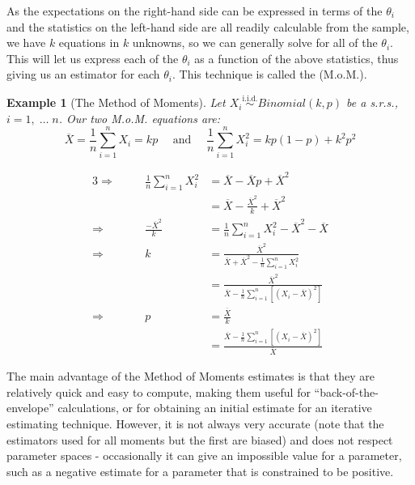\documentclass[12pt,a4paper]{article}
\newtheorem{ex}[thm]{Example}
\newcommand{\uline}[1]{\underline{\smash{#1}}}
\begin{document}
As the expectations on the right-hand side can be expressed in terms of the $\theta_i$ and the statistics on the left-hand side are all readily calculable from the sample, we have $k$ equations in $k$ unknowns, so we can generally solve for all of the $\theta_i$. This will let us express each of the $\theta_i$ as a function of the above statistics, thus giving us an estimator for each $\theta_i$. This technique is called the \uline{Method of Moments} (M.o.M.).

\begin{ex}[The Method of Moments]\vspace{1cm}

Let $X_i \overset{\text{i.i.d.}}{\sim} Binomial(k,p)$ be a s.r.s., $i = 1,\;\hdots\;n$. Our two M.o.M. equations are:
$$\overline{X}=\frac{1}{n}\sum_{i=1}^n X_i = kp \quad\mbox{ and }\quad \frac{1}{n}\sum_{i=1}^n X_i^2 = kp(1-p) + k^2p^2$$

\begin{alignat*}{3}
\Rightarrow\quad & & \frac{1}{n} \sum_{i=1}^n X_i^2 &= \overline{X} - \overline{X}p + \overline{X}^2\\
& & &= \overline{X} - \frac{\overline{X}^2}{k} + \overline{X}^2\\
\Rightarrow \quad & & \frac{-\overline{X}^2}{k} &= \frac{1}{n}\sum_{i=1}^n X_i^2 - \overline{X}^2 - \overline{X}\\
\Rightarrow\quad & & k &= \frac{\overline{X}^2}{\overline{X}+\overline{X}^2 - \frac{1}{n}\sum\limits_{i=1}^n X_i^2}\\
& & &= \frac{\overline{X}^2}{\overline{X} - \frac{1}{n}\sum\limits_{i=1}^n \left[(X_i - \overline{X})^2\right]}\\
\Rightarrow\quad &  & p &= \frac{\overline{X}}{k}\\
& & &= \frac{\overline{X} - \frac{1}{n}\sum\limits_{i=1}^n \left[(X_i - \overline{X})^2\right]}{\overline{X}}
\end{alignat*}

\end{ex}

The main advantage of the Method of Moments estimates is that they are relatively quick and easy to compute, making them useful for ``back-of-the-envelope'' calculations, or for obtaining an initial estimate for an iterative estimating technique. However, it is not always very accurate (note that the estimators used for all moments but the first are biased) and does not respect parameter spaces - occasionally it can give an impossible value for a parameter, such as a negative estimate for a parameter that is constrained to be positive.
\end{document}
